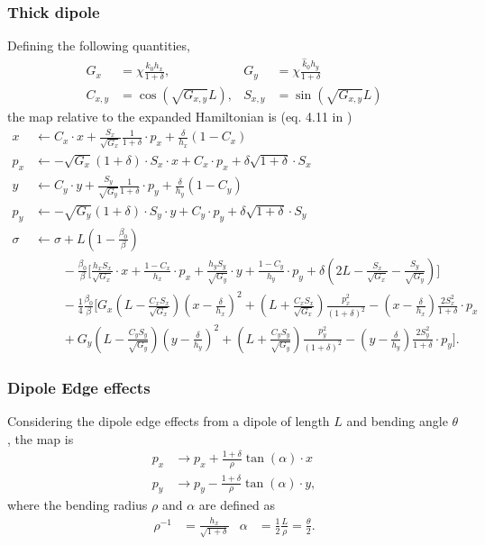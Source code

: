 \documentclass[english]{article}
\begin{document}
\subsubsection{Thick dipole}
Defining the following quantities,
\begin{align}
  G_x&= \chi \frac{k_0 h_x}{1+\delta}, & G_y&= \chi \frac{ \hat k_0 h_y}{1+\delta} \\
  C_{x,y}&=\cos(\sqrt{G_{x,y}}L), & S_{x,y}&=\sin(\sqrt{G_{x,y}}L)
\end{align}
the map relative to the expanded Hamiltonian is (eq. 4.11 in \cite{barber87})
\begin{align}
  x   &\leftarrow C_x \cdot x + \frac{S_x}{\sqrt{G_x}}\frac{1}{1+\delta} \cdot p_x + \frac{\delta}{h_x} (1 - C_x) \\
  p_x &\leftarrow -\sqrt{G_x} (1+\delta) \cdot S_x \cdot x + C_x \cdot p_x + \delta \sqrt{1+\delta} \cdot S_x \\
  y   &\leftarrow C_y \cdot y + \frac{S_y}{\sqrt{G_y}}\frac{1}{1+\delta} \cdot p_y + \frac{\delta}{h_y} (1 - C_y) \\
  p_y &\leftarrow -\sqrt{G_y} (1+\delta) \cdot S_y \cdot y + C_y \cdot p_y + \delta \sqrt{1+\delta} \cdot S_y \\
  \sigma &\leftarrow \sigma + L\left(1 - \frac{\beta_0}{\beta}\right) \\
  & \qquad\, -\frac{\beta_0}{\beta} \Bigg[ \frac{h_x S_x}{\sqrt{G_x}} \cdot x + \frac{1-C_x}{h_x} \cdot p_x
  + \frac{h_y S_y}{\sqrt{G_y}} \cdot y + \frac{1-C_y}{h_y} \cdot p_y
  + \delta \left(2L - \frac{S_x}{\sqrt{G_x}} - \frac{S_y}{\sqrt{G_y}} \right) \Bigg] \\
  & \qquad\, - \frac{1}{4}\frac{\beta_0}{\beta} \Bigg[ G_x \left(L-\frac{C_xS_x}{\sqrt{G_x}} \right)
  \left(x - \frac{\delta}{h_x}\right)^2
  + \left(L+\frac{C_xS_x}{\sqrt{G_x}} \right) \frac{p_x^2}{(1+\delta)^2}
  -\left(x-\frac{\delta}{h_x}\right) \frac{2S_x^2}{1+\delta} \cdot p_x \\
  & \qquad\, + G_y \left(L-\frac{C_yS_y}{\sqrt{G_y}} \right)
  \left(y - \frac{\delta}{h_y}\right)^2 + \left(L+\frac{C_yS_y}{\sqrt{G_y}}\right) 
  \frac{p_y^2}{(1+\delta)^2}
  -\left(y-\frac{\delta}{h_y}\right)\frac{2S_y^2}{1+\delta} \cdot p_y \Bigg].
\end{align}

\subsubsection{Dipole Edge effects}
Considering the dipole edge effects from a dipole of length $L$ and bending angle $\theta$, 
the map is
\begin{align*}
    p_x &\to p_x + \frac{1+\delta}{\rho} \tan(\alpha) \cdot x \\
    p_y &\to p_y - \frac{1+\delta}{\rho} \tan(\alpha) \cdot y,
\end{align*}
where the bending radius $\rho$ and $\alpha$ are defined as
\begin{align*}
    \rho^{-1}   &= \frac{h_x}{\sqrt{1+\delta}} &
    \alpha &= \frac{1}{2} \frac{L}{\rho} = \frac{\theta}{2}.
\end{align*}
\end{document}
